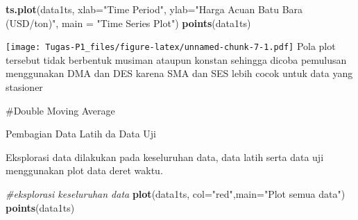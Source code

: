 \documentclass[
]{article}
\newenvironment{Shaded}{\begin{snugshade}}{\end{snugshade}}
\newcommand{\AttributeTok}[1]{\textcolor[rgb]{0.13,0.29,0.53}{#1}}
\newcommand{\CommentTok}[1]{\textcolor[rgb]{0.56,0.35,0.01}{\textit{#1}}}
\newcommand{\DecValTok}[1]{\textcolor[rgb]{0.00,0.00,0.81}{#1}}
\newcommand{\FunctionTok}[1]{\textcolor[rgb]{0.13,0.29,0.53}{\textbf{#1}}}
\newcommand{\NormalTok}[1]{#1}
\newcommand{\OtherTok}[1]{\textcolor[rgb]{0.56,0.35,0.01}{#1}}
\newcommand{\SpecialCharTok}[1]{\textcolor[rgb]{0.81,0.36,0.00}{\textbf{#1}}}
\newcommand{\StringTok}[1]{\textcolor[rgb]{0.31,0.60,0.02}{#1}}
\begin{document}
\begin{Shaded}
\begin{Highlighting}[]
\FunctionTok{ts.plot}\NormalTok{(data1ts, }\AttributeTok{xlab=}\StringTok{"Time Period"}\NormalTok{, }\AttributeTok{ylab=}\StringTok{"Harga Acuan Batu Bara (USD/ton)"}\NormalTok{, }
        \AttributeTok{main =} \StringTok{"Time Series Plot"}\NormalTok{)}
\FunctionTok{points}\NormalTok{(data1ts)}
\end{Highlighting}
\end{Shaded}

\texttt{[image: Tugas-P1\_files/figure-latex/unnamed-chunk-7-1.pdf]} Pola
plot tersebut tidak berbentuk musiman ataupun konstan sehingga dicoba
pemulusan menggunakan DMA dan DES karena SMA dan SES lebih cocok untuk
data yang stasioner

\#Double Moving Average

Pembagian Data Latih da Data Uji

\begin{Shaded}
\end{Shaded}

Eksplorasi data dilakukan pada keseluruhan data, data latih serta data
uji menggunakan plot data deret waktu.

\begin{Shaded}
\begin{Highlighting}[]
\CommentTok{\#eksplorasi keseluruhan data}
\FunctionTok{plot}\NormalTok{(data1ts, }\AttributeTok{col=}\StringTok{"red"}\NormalTok{,}\AttributeTok{main=}\StringTok{"Plot semua data"}\NormalTok{)}
\FunctionTok{points}\NormalTok{(data1ts)}
\end{Highlighting}
\end{Shaded}
\end{document}

